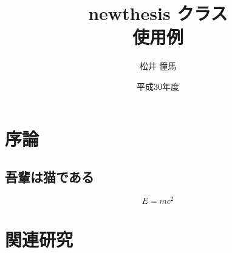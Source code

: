 \documentclass[dvipdfmx]{newthesis}
\title{%
  newthesis クラス \\
  使用例
\\}
\author{松井 憧馬}
\date{平成30年度}
\affiliation{%
  大阪市立大学 工学部 電気情報工学科 \\
  制御システム理論研究室 \\
}
\begin{document}
\maketitle

\begin{abstract}
\end{abstract}

\thesisindex

\chapter{序論}\label{chap:intro}

\section{吾輩は猫である}

\cite{wagahai}

\begin{equation}
  E = mc^2
\end{equation}

\chapter{関連研究}

\cite{wagahai}

\begin{acknowledgment}
  \cite{preamble}
\end{acknowledgment}

\thesisbib
\end{document}
